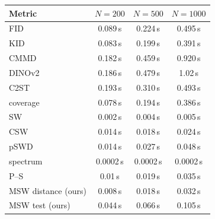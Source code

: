\begin{tabular}{lccc}
\toprule
Metric & $N{=}200$ & $N{=}500$ & $N{=}1000$ \\
\midrule
FID & 0.089\,s & 0.224\,s & 0.495\,s \\
KID & 0.083\,s & 0.199\,s & 0.391\,s \\
CMMD & 0.182\,s & 0.459\,s & 0.920\,s \\
DINOv2 & 0.186\,s & 0.479\,s & 1.02\,s \\
C2ST & 0.193\,s & 0.310\,s & 0.493\,s \\
coverage & 0.078\,s & 0.194\,s & 0.386\,s \\
SW & 0.002\,s & 0.004\,s & 0.005\,s \\
CSW & 0.014\,s & 0.018\,s & 0.024\,s \\
pSWD & 0.014\,s & 0.027\,s & 0.048\,s \\
spectrum & 0.0002\,s & 0.0002\,s & 0.0002\,s \\
P--S & 0.01\,s & 0.019\,s & 0.035\,s \\
\midrule
MSW distance (ours) & 0.008\,s & 0.018\,s & 0.032\,s \\
MSW test (ours) & 0.044\,s & 0.066\,s & 0.105\,s \\
\bottomrule
\end{tabular}
